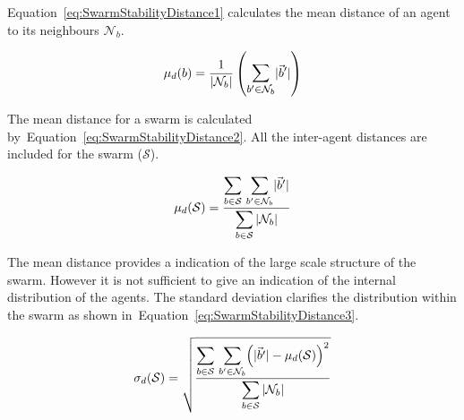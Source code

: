 \documentclass{ieeeaccess}
\newcommand{\card}[1]{\vert{#1}\vert}
\newcommand{\magn}[1]{\vert{#1}\vert}
\begin{document}
Equation~\ref{eq:SwarmStabilityDistance1} calculates the mean distance of an
agent to its neighbours $\mathcal{N}_b$. 

\begin{equation}
\label{eq:SwarmStabilityDistance1}
\mu_d(b) =
\frac{1}{\mathlarger{\card{\mathcal{N}_b}}}\left({\mathlarger{\sum_{b' \in
\mathcal{N}_b}}\magn{\vec b'}}\right)
\end{equation}

The mean distance for a swarm is calculated
by~Equation~\ref{eq:SwarmStabilityDistance2}. All the inter-agent distances
are included for the swarm ($\mathcal S$). 


\begin{equation}
\label{eq:SwarmStabilityDistance2}
\mu_d(\mathcal S) = \frac{\mathlarger{\sum_{b \in
\mathcal S}}~\mathlarger{\sum_{b' \in
\mathcal{N}_b}}\magn{\vec b'}}{\mathlarger{\sum_{b \in
\mathcal S}\card{\mathcal{N}_b}}}
\end{equation}

The mean distance provides a indication of the large scale structure of the swarm. However it is not sufficient to give an indication of the internal distribution of the agents. The standard deviation clarifies the distribution within the swarm as shown in~Equation~\ref{eq:SwarmStabilityDistance3}. 


\begin{equation}
\label{eq:SwarmStabilityDistance3}
\sigma_d(\mathcal S) = \sqrt{\frac{\mathlarger{\sum_{b \in
\mathcal S}}~\mathlarger{\sum_{b' \in \mathcal{N}_b}}\Big(\magn{\vec b'} -
\mu_d(\mathcal S)\Big)^2}{\mathlarger{\sum_{b \in
\mathcal S}\card{\mathcal{N}_b}}}}
\end{equation}
\end{document}
